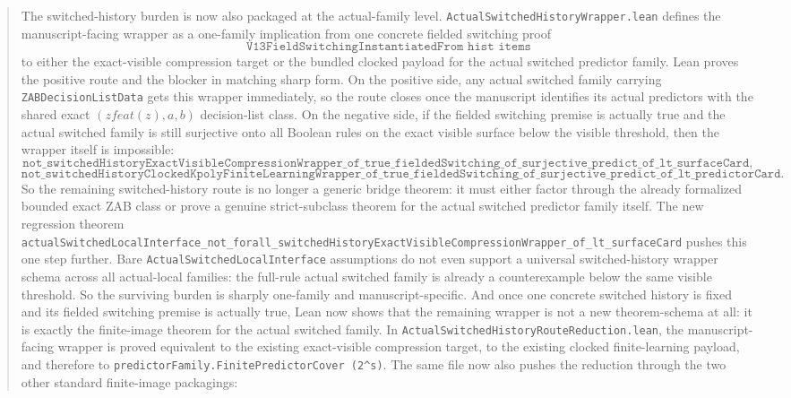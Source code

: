 \documentclass[11pt]{article}
\theoremstyle{remark}
\begin{document}
\begin{abstract}
The switched-history burden is now also packaged at the actual-family level.
\texttt{ActualSwitchedHistoryWrapper.lean} defines the manuscript-facing
wrapper as a one-family implication from one concrete fielded switching proof
\[
  \texttt{V13FieldSwitchingInstantiatedFrom hist items}
\]
to either the exact-visible compression target or the bundled clocked payload
for the actual switched predictor family.  Lean proves the positive route and
the blocker in matching sharp form.  On the positive side, any actual switched
family carrying \texttt{ZABDecisionListData} gets this wrapper immediately, so
the route closes once the manuscript identifies its actual predictors with the
shared exact \((zfeat(z),a,b)\) decision-list class.  On the negative side, if
the fielded switching premise is actually true and the actual switched family
is still surjective onto all Boolean rules on the exact visible surface below
the visible threshold, then the wrapper itself is impossible:
\[
  \texttt{not\_switchedHistoryExactVisibleCompressionWrapper\_of\_true\_fieldedSwitching\_of\_surjective\_predict\_of\_lt\_surfaceCard},
\]
\[
  \texttt{not\_switchedHistoryClockedKpolyFiniteLearningWrapper\_of\_true\_fieldedSwitching\_of\_surjective\_predict\_of\_lt\_predictorCard}.
\]
So the remaining switched-history route is no longer a generic bridge theorem:
it must either factor through the already formalized bounded exact ZAB class or
prove a genuine strict-subclass theorem for the actual switched predictor
family itself.
The new regression theorem
\texttt{actualSwitchedLocalInterface\_not\_forall\_switchedHistoryExactVisibleCompressionWrapper\_of\_lt\_surfaceCard}
pushes this one step further.  Bare
\texttt{ActualSwitchedLocalInterface} assumptions do not even support a
universal switched-history wrapper schema across all actual-local families: the
full-rule actual switched family is already a counterexample below the same
visible threshold.  So the surviving burden is sharply one-family and
manuscript-specific.
And once one concrete switched history is fixed and its fielded switching
premise is actually true, Lean now shows that the remaining wrapper is not a
new theorem-schema at all: it is exactly the finite-image theorem for the
actual switched family.  In
\texttt{ActualSwitchedHistoryRouteReduction.lean}, the manuscript-facing wrapper
is proved equivalent to the existing exact-visible compression target, to the
existing clocked finite-learning payload, and therefore to
\texttt{predictorFamily.FinitePredictorCover (2\^{}s)}.  The same file now also
pushes the reduction through the two other standard finite-image packagings:

\end{abstract}
\end{document}
